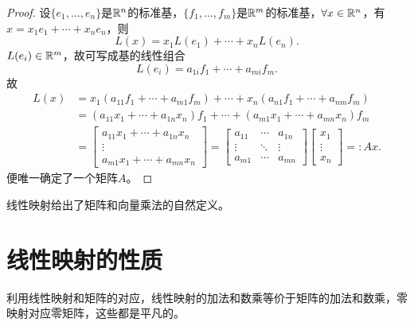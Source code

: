 \begin{proof}
	设$\{e_1,\ldots,e_n\}$是$\mathbb R^n$的标准基，$\{f_1,\ldots,f_m\}$是$\mathbb R^m$的标准基，$\forall x\in\mathbb R^n$，有$x=x_1e_1+\cdots+x_ne_n$，则
	\[
		L(x)=x_1L(e_1)+\cdots+x_nL(e_n).
	\]
	$L(e_i)\in\mathbb R^m$，故可写成基的线性组合
	\[
		L(e_i)=a_{1i}f_1+\cdots+a_{mi}f_m.
	\]
	故
	\begin{align*}
		L(x)&=x_1(a_{11}f_1+\cdots+a_{m1}f_m)+\cdots+x_n(a_{n1}f_1+\cdots+a_{nm}f_m)\\
		&=(a_{11}x_1+\cdots+a_{1n}x_n)f_1+\cdots+(a_{m1}x_1+\cdots+a_{mn}x_n)f_m\\
		&=\begin{bmatrix}
			a_{11}x_1+\cdots+a_{1n}x_n\\\vdots\\
			a_{m1}x_1+\cdots+a_{mn}x_n
		\end{bmatrix}=\begin{bmatrix}
			a_{11}&\cdots&a_{1n}\\
			\vdots&\ddots&\vdots\\
			a_{m1}&\cdots&a_{mn}
		\end{bmatrix}\begin{bmatrix}
			x_1\\\vdots\\x_n
		\end{bmatrix}=:Ax.
	\end{align*}
	便唯一确定了一个矩阵$A$。
\end{proof}

线性映射给出了矩阵和向量乘法的自然定义。
\section{线性映射的性质}
利用线性映射和矩阵的对应，线性映射的加法和数乘等价于矩阵的加法和数乘，零映射对应零矩阵，这些都是平凡的。


